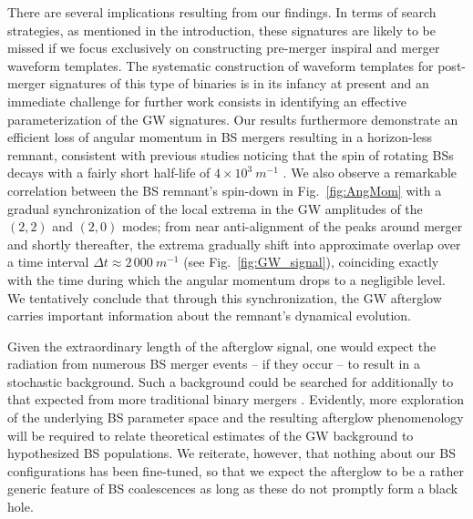\documentclass[aps,twocolumn,nofootinbib,superscriptaddress,amsfonts,floatfix
]{revtex4-1} %
\begin{document}
There are several implications resulting from our
findings. In terms of search strategies, as mentioned in the introduction, these signatures are likely to be missed if we focus exclusively on constructing pre-merger inspiral and merger waveform templates. The systematic construction of waveform templates for post-merger signatures of this type of binaries
is in its infancy at present and an immediate challenge
for further work consists in identifying an effective
parameterization of the GW signatures. Our results furthermore
demonstrate an efficient loss of angular momentum in BS mergers
resulting in a horizon-less remnant, consistent with previous studies noticing that the spin of rotating BSs decays with a fairly short half-life of $4\times 10^3~m^{-1}$ \cite{Sanchis-Gual:2019ljs}. We also observe
a remarkable correlation between the BS remnant's spin-down
in Fig.~\ref{fig:AngMom} with a gradual synchronization
of the local extrema in the GW amplitudes of the $(2,2)$
and $(2,0)$ modes; from near anti-alignment of the
peaks around merger and shortly thereafter, the extrema
gradually shift into approximate overlap over a time
interval $\Delta t \approx 2\,000~m^{-1}$ (see
Fig.~\ref{fig:GW_signal}), coinciding
exactly with the time during which the angular momentum
drops to a negligible level.
We tentatively conclude that through this synchronization,
the GW afterglow carries important information about the remnant's dynamical evolution. 

Given the extraordinary length of the afterglow signal, one
would expect the radiation from numerous BS merger events
-- if they occur -- to result in a stochastic background.
Such a background could be searched for additionally
to that expected from more traditional binary mergers
\cite{Croon:2018ftb}. Evidently, more exploration of the
underlying BS parameter space and the resulting afterglow
phenomenology will be required to relate theoretical
estimates of the GW background to hypothesized BS populations.
We reiterate, however, that nothing about our BS configurations
has been fine-tuned, so that we expect the afterglow to be a
rather generic feature of BS coalescences as long as these do 
not promptly form a black hole.
\end{document}
